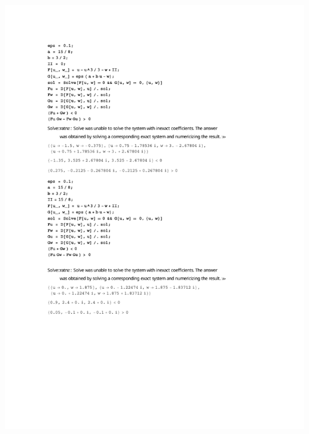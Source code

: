 \documentclass[12pt]{article}
\newenvironment{exercise}[2][Exercise]{\begin{trivlist}
\item[\hskip \labelsep {\bfseries #1}\hskip \labelsep {\bfseries #2.}]}{\end{trivlist}}
\begin{document}
\begin{exercise}{3.1}
\begin{enumerate}
	\includegraphics[width=6.5in]{excercise_31}
\end{enumerate}

\end{exercise}
\end{document}
